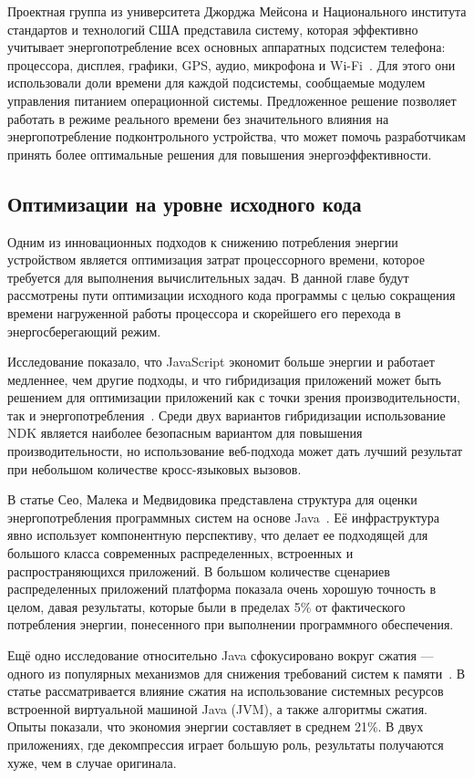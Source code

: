 \documentclass[a4paper,14pt]{extarticle} %
\begin{document}
	Проектная группа из университета Джорджа Мейсона и Национального института стандартов и технологий США представила систему, которая эффективно учитывает энергопотребление всех основных аппаратных подсистем телефона: процессора, дисплея, графики, GPS, аудио, микрофона и Wi-Fi~\parencite{murmuria2012mobile}. Для этого они использовали доли времени для каждой подсистемы, сообщаемые модулем управления питанием операционной системы. Предложенное решение позволяет работать в режиме реального времени без значительного влияния на энергопотребление подконтрольного устройства, что может помочь разработчикам принять более оптимальные решения для повышения энергоэффективности.

	\subsection{Оптимизации на уровне исходного кода}

	Одним из инновационных подходов к снижению потребления энергии устройством является оптимизация затрат процессорного времени, которое требуется для выполнения вычислительных задач. В данной главе будут рассмотрены пути оптимизации исходного кода программы с целью сокращения времени нагруженной работы процессора и скорейшего его перехода в энергосберегающий режим.
	
	Исследование показало, что JavaScript экономит больше энергии и работает медленнее, чем другие подходы, и что гибридизация приложений может быть решением для оптимизации приложений как с точки зрения производительности, так и энергопотребления~\parencite{oliveira2017study}. Среди двух вариантов гибридизации использование NDK является наиболее безопасным вариантом для повышения производительности, но использование веб-подхода может дать лучший результат при небольшом количестве кросс-языковых вызовов.
	
	В статье Сео, Малека и Медвидовика представлена структура для оценки энергопотребления программных систем на основе Java~\parencite{seo2007energy}. Её инфраструктура явно использует компонентную перспективу, что делает ее подходящей для большого класса современных распределенных, встроенных и распространяющихся приложений. В большом количестве сценариев распределенных приложений платформа показала очень хорошую точность в целом, давая результаты, которые были в пределах 5\% от фактического потребления энергии, понесенного при выполнении программного обеспечения. 
	
	Ещё одно исследование относительно Java сфокусировано вокруг сжатия — одного из популярных механизмов для снижения требований систем к памяти~\parencite{гуанджиу2004экономия}. В статье рассматривается влияние сжатия на использование системных ресурсов встроенной виртуальной машиной Java (JVM), а также алгоритмы сжатия. Опыты показали, что экономия энергии составляет в среднем 21\%. В двух приложениях, где декомпрессия играет большую роль, результаты получаются хуже, чем в случае оригинала.
	
\end{document}
